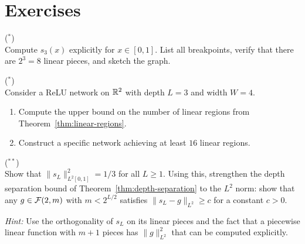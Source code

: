 \documentclass[11pt,a4paper]{article}
\begin{document}
\section{Exercises}
\label{sec:exercises}

\begin{exercise}
\textnormal{(\({}^*\))} \\
Compute $s_3(x)$ explicitly for $x \in [0, 1]$.  List all breakpoints,
verify that there are $2^3 = 8$ linear pieces, and sketch the graph.
\end{exercise}

\begin{exercise}
\textnormal{(\({}^*\))} \\
Consider a ReLU network on $\mathbb{R}^2$ with depth $L = 3$ and width $W = 4$.
\begin{enumerate}[label=(\alph*)]
  \item Compute the upper bound on the number of linear regions from
    Theorem~\ref{thm:linear-regions}.
  \item Construct a specific network achieving at least $16$ linear
    regions.
\end{enumerate}
\end{exercise}

\begin{exercise}
\textnormal{(\({}^{**}\))} \\
Show that $\|s_L\|_{L^2[0,1]}^2 = 1/3$ for all $L \ge 1$.
Using this, strengthen the depth separation bound of
Theorem~\ref{thm:depth-separation} to the $L^2$ norm: show that
any $g \in \mathcal{F}(2, m)$ with $m < 2^{L/2}$ satisfies
$\|s_L - g\|_{L^2} \ge c$ for a constant $c > 0$.

\textit{Hint:} Use the orthogonality of $s_L$ on its linear pieces
and the fact that a piecewise linear function with $m+1$ pieces
has $\|g\|_{L^2}^2$ that can be computed explicitly.
\end{exercise}
\end{document}
